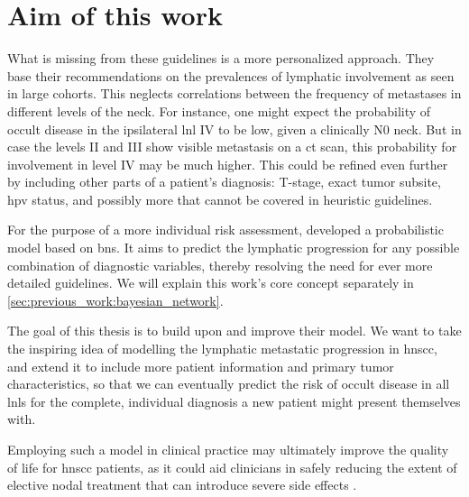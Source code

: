\documentclass[\relativeRoot/main.tex]{subfiles}
\begin{document}
\section{Aim of this work}
\label{sec:intro:aim}

What is missing from these guidelines is a more personalized approach. They base their recommendations on the prevalences of lymphatic involvement as seen in large cohorts. This neglects correlations between the frequency of metastases in different levels of the neck. For instance, one might expect the probability of occult disease in the ipsilateral \gls{lnl} IV to be low, given a clinically N0 neck. But in case the levels II and III show visible metastasis on a \gls{ct} scan, this probability for involvement in level IV may be much higher. This could be refined even further by including other parts of a patient's diagnosis: T-stage, exact tumor subsite, \gls{hpv} status, and possibly more that cannot be covered in heuristic guidelines.

For the purpose of a more individual risk assessment,  developed a probabilistic model based on \glspl{bn}. It aims to predict the lymphatic progression for any possible combination of diagnostic variables, thereby resolving the need for ever more detailed guidelines. We will explain this work's core concept separately in \cref{sec:previous_work:bayesian_network}.

The goal of this thesis is to build upon and improve their model. We want to take the inspiring idea of modelling the lymphatic metastatic progression in \gls{hnscc}, and extend it to include more patient information and primary tumor characteristics, so that we can eventually predict the risk of occult disease in all \glspl{lnl} for the complete, individual diagnosis a new patient might present themselves with.

Employing such a model in clinical practice may ultimately improve the quality of life for \gls{hnscc} patients, as it could aid clinicians in safely reducing the extent of elective nodal treatment that can introduce severe side effects \cite{batth_practical_2014}.
\end{document}
